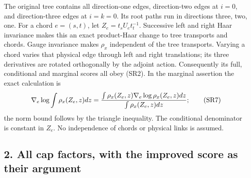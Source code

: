 \documentclass[11pt]{article}
\begin{document}
The original tree contains all direction-one edges, direction-two edges at \(i=0\), and direction-three edges at \(i=k=0\). Its root paths run in directions three, two, one. For a chord \(e=(s,t)\), let \(Z_e=t_sU_et_t^{-1}\). Successive left and right Haar invariance makes this an exact product-Haar change to tree transports and chords. Gauge invariance makes \(\rho_x\) independent of the tree transports. Varying a chord varies that physical edge through left and right translations; its three derivatives are rotated orthogonally by the adjoint action. Consequently its full, conditional and marginal scores all obey (SR2). In the marginal assertion the exact calculation is
\[
\nabla_e\log\int\rho_x(Z_e,z)dz
={\int\rho_x(Z_e,z)\nabla_e\log\rho_x(Z_e,z)dz\over
\int\rho_x(Z_e,z)dz};
\tag{SR7}
\]
the norm bound follows by the triangle inequality. The conditional denominator is constant in \(Z_e\). No independence of chords or physical links is assumed.

\subsection*{2. All cap factors, with the improved score as their argument}
\end{document}
